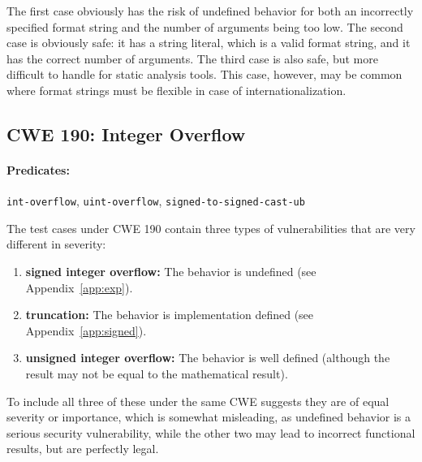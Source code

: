 \documentclass[11pt]{article}
\begin{document}
The first case obviously has the risk of undefined behavior for both an incorrectly specified
format  string and the number of arguments being too low. The second case is obviously safe: it
has a string literal, which is a valid format string, and it has the correct number of arguments.
The third case is also safe, but more difficult to handle for static analysis tools. This case,
however, may be common where format strings must be flexible in case of internationalization.

\subsection{CWE 190: Integer Overflow}

\paragraph{Predicates:} {\tt int-overflow}, {\tt uint-overflow},
{\tt signed-to-signed-cast-ub}

The test cases under CWE 190 contain three types of vulnerabilities that are very different
in severity:
\begin{enumerate}
\item {\bf signed integer overflow:} The behavior is undefined (see Appendix~\ref{app:exp}).
\item {\bf truncation:} The behavior is implementation defined (see Appendix~\ref{app:signed}).
\item {\bf unsigned integer overflow:} The behavior is well defined (although the result may
not be equal to the mathematical result).
\end{enumerate}

To include all three of these under the same CWE suggests they are of equal severity or
importance, which is somewhat misleading, as undefined behavior is a serious security
vulnerability, while the other two may lead to incorrect functional results, but are
perfectly legal.
\end{document}
